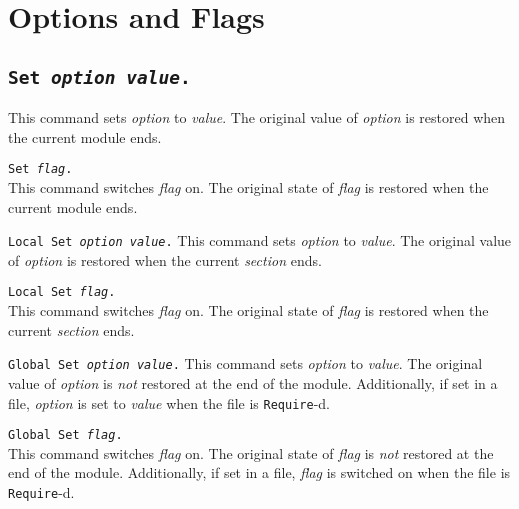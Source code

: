 
\section{Options and Flags}
\subsection[\tt Set {\rm\sl option} {\rm\sl value}.]{\tt Set {\rm\sl option} {\rm\sl value}.}
This command sets {\rm\sl option} to {\rm\sl value}. The original value of
{\rm\sl option} is restored when the current module ends.

\begin{Variants}
\item {\tt Set {\rm\sl flag}.}\\
This command switches {\rm\sl flag} on. The original state of
{\rm\sl flag} is restored when the current module ends.
\item {\tt Local Set {\rm\sl option} {\rm\sl value}.}
This command sets {\rm\sl option} to {\rm\sl value}. The original value of
{\rm\sl option} is restored when the current \emph{section} ends.
\item {\tt Local Set {\rm\sl flag}.}\\
This command switches {\rm\sl flag} on. The original state of
{\rm\sl flag} is restored when the current \emph{section} ends.
\item {\tt Global Set {\rm\sl option} {\rm\sl value}.}
This command sets {\rm\sl option} to {\rm\sl value}. The original value of
{\rm\sl option} is \emph{not} restored at the end of the module. Additionally,
if set in a file, {\rm\sl option} is set to {\rm\sl value} when the file is
{\tt Require}-d.
\item {\tt Global Set {\rm\sl flag}.}\\
This command switches {\rm\sl flag} on. The original state of
{\rm\sl flag} is \emph{not} restored at the end of the module. Additionally,
if set in a file, {\rm\sl flag} is switched on when the file is
{\tt Require}-d.
\end{Variants}

